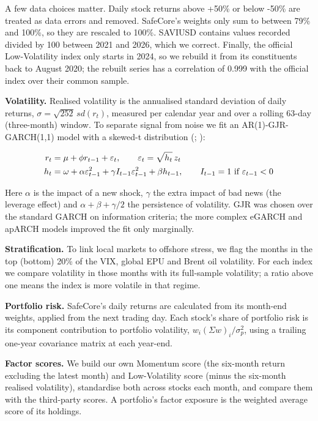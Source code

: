 \documentclass[11pt,preprint]{elsarticle}
\numberwithin{equation}{section}
\numberwithin{figure}{section}
\numberwithin{table}{section}
\begin{document}
A few data choices matter. Daily stock returns above +50\% or below
-50\% are treated as data errors and removed. SafeCore's weights only
sum to between 79\% and 100\%, so they are rescaled to 100\%. SAVIUSD
contains values recorded divided by 100 between 2021 and 2026, which we
correct. Finally, the official Low-Volatility index only starts in 2024,
so we rebuild it from its constituents back to August 2020; the rebuilt
series has a correlation of 0.999 with the official index over their
common sample.

\textbf{Volatility.} Realised volatility is the annualised standard
deviation of daily returns, \(\sigma = \sqrt{252}\, sd(r_t)\), measured
per calendar year and over a rolling 63-day (three-month) window. To
separate signal from noise we fit an AR(1)-GJR-GARCH(1,1) model with a
skewed-t distribution (;
):

\begin{align}
r_t &= \mu + \phi r_{t-1} + \varepsilon_t, \qquad \varepsilon_t = \sqrt{h_t}\, z_t \notag \\
h_t &= \omega + \alpha \varepsilon_{t-1}^2 + \gamma I_{t-1}\varepsilon_{t-1}^2 + \beta h_{t-1}, \qquad I_{t-1} = 1 \text{ if } \varepsilon_{t-1} < 0 \label{eq1}
\end{align}

Here \(\alpha\) is the impact of a new shock, \(\gamma\) the extra
impact of bad news (the leverage effect) and
\(\alpha + \beta + \gamma/2\) the persistence of volatility. GJR was
chosen over the standard GARCH on information criteria; the more complex
eGARCH and apARCH models improved the fit only marginally.

\textbf{Stratification.} To link local markets to offshore stress, we
flag the months in the top (bottom) 20\% of the VIX, global EPU and
Brent oil volatility. For each index we compare volatility in those
months with its full-sample volatility; a ratio above one means the
index is more volatile in that regime.

\textbf{Portfolio risk.} SafeCore's daily returns are calculated from
its month-end weights, applied from the next trading day. Each stock's
share of portfolio risk is its component contribution to portfolio
volatility, \(w_i (\Sigma w)_i / \sigma_p^2\), using a trailing one-year
covariance matrix at each year-end.

\textbf{Factor scores.} We build our own Momentum score (the six-month
return excluding the latest month) and Low-Volatility score (minus the
six-month realised volatility), standardise both across stocks each
month, and compare them with the third-party scores. A portfolio's
factor exposure is the weighted average score of its holdings.
\end{document}
